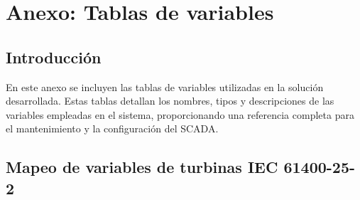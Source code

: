 \chapter{Anexo: Tablas de variables}
\label{cap:Tablas_Variab}

\section{Introducción}
En este anexo se incluyen las tablas de variables utilizadas en la solución desarrollada. Estas tablas detallan los nombres, tipos y descripciones de las variables empleadas en el sistema, proporcionando una referencia completa para el mantenimiento y la configuración del SCADA.
\section{Mapeo de variables de turbinas IEC 61400-25-2}
